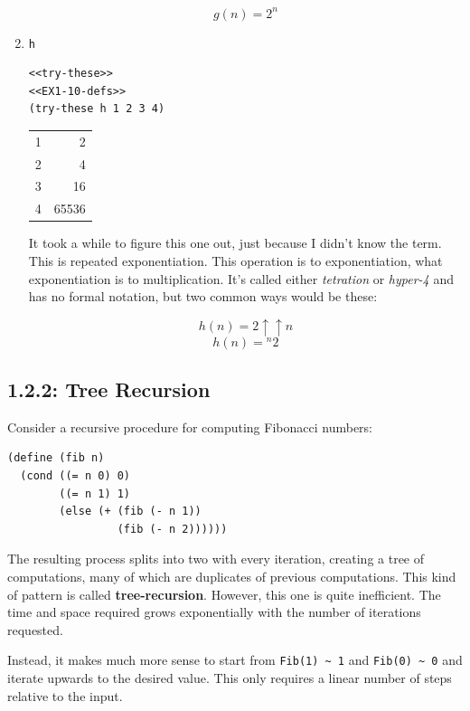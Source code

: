 \documentclass[final,fleqn,titlepage,twoside]{article}
\begin{document}
\begin{enumerate}
\[
g(n)=2^n
\]

\item \texttt{h}
\label{sec:org0756000}
\begin{verbatim}
<<try-these>>
<<EX1-10-defs>>
(try-these h 1 2 3 4)
\end{verbatim}

\begin{center}
\begin{tabular}{rr}
1 & 2\\[0pt]
2 & 4\\[0pt]
3 & 16\\[0pt]
4 & 65536\\[0pt]
\end{tabular}
\end{center}

It took a while to figure this one out, just because I didn't know the term.
This is repeated exponentiation. This operation is to exponentiation, what
exponentiation is to multiplication. It's called either \emph{tetration} or \emph{hyper-4}
and has no formal notation, but two common ways would be these:

\[
h(n)=2 \uparrow\uparrow n
\]
\[
h(n)={}^{n}2
\]
\end{enumerate}

\subsection{1.2.2: Tree Recursion}
\label{sec:org14a9342}
Consider a recursive procedure for computing Fibonacci numbers:

\begin{verbatim}
(define (fib n)
  (cond ((= n 0) 0)
        ((= n 1) 1)
        (else (+ (fib (- n 1))
                 (fib (- n 2))))))
\end{verbatim}

The resulting process splits into two with every iteration, creating a tree of
computations, many of which are duplicates of previous computations. This kind
of pattern is called \textbf{tree-recursion}. However, this one is quite inefficient.
The time and space required grows exponentially with the number of iterations
requested.

Instead, it makes much more sense to start from \texttt{Fib(1) \textasciitilde{} 1} and \texttt{Fib(0) \textasciitilde{} 0}
and iterate upwards to the desired value. This only requires a linear number of
steps relative to the input.
\end{document}
